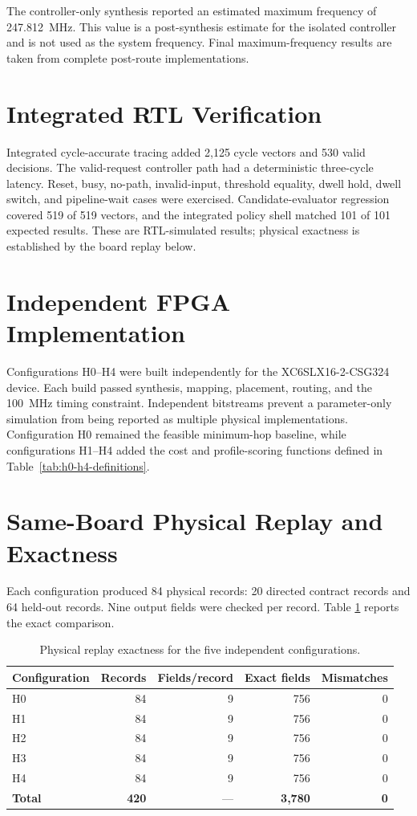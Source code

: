 The controller-only synthesis reported an estimated maximum frequency of
247.812~MHz. This value is a post-synthesis estimate for the isolated controller and
is not used as the system frequency. Final maximum-frequency results are taken from
complete post-route implementations.

\section{Integrated RTL Verification}

Integrated cycle-accurate tracing added 2,125 cycle vectors and 530 valid decisions.
The valid-request controller path had a deterministic three-cycle latency. Reset,
busy, no-path, invalid-input, threshold equality, dwell hold, dwell switch, and
pipeline-wait cases were exercised. Candidate-evaluator regression covered 519 of
519 vectors, and the integrated policy shell matched 101 of 101 expected results.
These are RTL-simulated results; physical exactness is established by the board
replay below.

\section{Independent FPGA Implementation}

Configurations H0--H4 were built independently for the XC6SLX16-2-CSG324 device.
Each build passed synthesis, mapping, placement, routing, and the 100~MHz timing
constraint. Independent bitstreams prevent a parameter-only simulation from being
reported as multiple physical implementations. Configuration H0 remained the
feasible minimum-hop baseline, while configurations H1--H4 added the
cost and profile-scoring functions defined in
Table~\ref{tab:h0-h4-definitions}.

\section{Same-Board Physical Replay and Exactness}

Each configuration produced 84 physical records: 20 directed contract records and
64 held-out records. Nine output fields were checked per record. Table
\ref{tab:physical-exactness} reports the exact comparison.

\begin{table}[H]
\centering
\caption{Physical replay exactness for the five independent configurations.}
\label{tab:physical-exactness}
\begin{tabular}{@{}lrrrr@{}}
\toprule
\textbf{Configuration} & \textbf{Records} & \textbf{Fields/record} &
\textbf{Exact fields} & \textbf{Mismatches}\\
\midrule
H0 & 84 & 9 & 756 & 0\\
H1 & 84 & 9 & 756 & 0\\
H2 & 84 & 9 & 756 & 0\\
H3 & 84 & 9 & 756 & 0\\
H4 & 84 & 9 & 756 & 0\\
\midrule
\textbf{Total} & \textbf{420} & --- & \textbf{3,780} & \textbf{0}\\
\bottomrule
\end{tabular}
\end{table}

